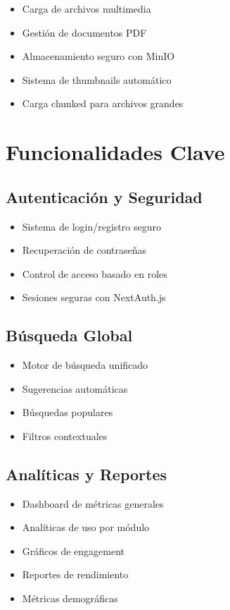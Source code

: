 \documentclass[12pt,a4paper]{article}
\begin{document}
\begin{itemize}
    \item Carga de archivos multimedia
    \item Gestión de documentos PDF
    \item Almacenamiento seguro con MinIO
    \item Sistema de thumbnails automático
    \item Carga chunked para archivos grandes
\end{itemize}

\section{Funcionalidades Clave}

\subsection{Autenticación y Seguridad}

\begin{itemize}
    \item Sistema de login/registro seguro
    \item Recuperación de contraseñas
    \item Control de acceso basado en roles
    \item Sesiones seguras con NextAuth.js
\end{itemize}

\subsection{Búsqueda Global}

\begin{itemize}
    \item Motor de búsqueda unificado
    \item Sugerencias automáticas
    \item Búsquedas populares
    \item Filtros contextuales
\end{itemize}

\subsection{Analíticas y Reportes}

\begin{itemize}
    \item Dashboard de métricas generales
    \item Analíticas de uso por módulo
    \item Gráficos de engagement
    \item Reportes de rendimiento
    \item Métricas demográficas
\end{itemize}
\end{document}
